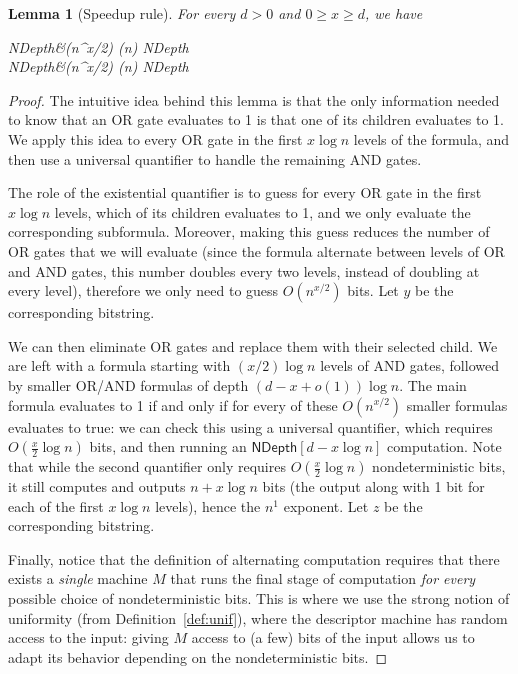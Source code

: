 \documentclass[a4paper, 11pt]{article}
\theoremstyle{plain}
\newtheorem{lemma}[theorem]{Lemma}
\theoremstyle{definition}
\theoremstyle{remark}
\newcommand{\ND}{\textsf{NDepth}}%
\newcommand{\NDL}[1]{\ND\left[ #1 \log n\right]}%
\begin{document}
\begin{lemma}[Speedup rule]\label{lemma:speedup}
	For every $d > 0$ and $0 \ge x \ge d$, we have
	\begin{flalign*}
	\NDL{d} &\subseteq (\exists n^{x/2}) (\forall n) \NDL{d-x}\\
	\NDL{d} &\subseteq (\forall n^{x/2}) (\exists n) \NDL{d-x}
	\end{flalign*}
\end{lemma}
\begin{proof}
	The intuitive idea behind this lemma is that the only
	information needed to know that an OR gate evaluates
	to 1 is that one of its children evaluates to 1. 
	We apply this idea to every OR gate in the first $x \log n$
	levels of the formula,
	and then use a universal quantifier to handle the remaining AND gates.

	The role of the existential quantifier is to guess for every OR gate in the first $x\log n$ levels,
	which of its children evaluates to 1, and we only evaluate the corresponding subformula.
	Moreover, making this guess reduces the number of OR gates that we will evaluate
	(since the formula alternate between levels of OR and AND gates, this number doubles every two levels,
	instead of doubling at every level), 
	therefore we only need to guess $O(n^{x/2})$ bits. 
	Let $y$ be the corresponding bitstring.

	We can then eliminate OR gates and replace them with their selected child.
	We are left with a formula starting with $(x/2)\log n$ levels of AND gates, 
	followed by smaller OR/AND formulas of depth $(d-x + o(1)) \log n$.
	The main formula evaluates to 1 if and only if for every of these $O(n^{x/2})$
	smaller formulas evaluates to true: 
	we can check this using a universal quantifier, 
	which requires $O(\frac{x}{2}\log n)$ bits, and then running an $\NDL{d-x}$ computation.
	Note that while the second quantifier only requires $O(\frac{x}{2}\log n)$ nondeterministic bits,
	it still computes and outputs $n + x\log n$ bits 
	(the output along with 1 bit for each of the first $x\log n$ levels), hence the $n^1$ exponent. 
	Let $z$ be the corresponding bitstring.

	Finally, notice that the definition of alternating computation
	requires that there exists a \textit{single} machine $M$ that runs the
	final stage of computation \textit{for every} possible choice of nondeterministic bits.
	This is where we use the strong notion of uniformity (from Definition~\ref{def:unif}), where the descriptor machine
	has random access to the input: giving $M$ access to (a few) bits of the input
	allows us to adapt its behavior depending on the nondeterministic bits.


\end{proof}
\end{document}
